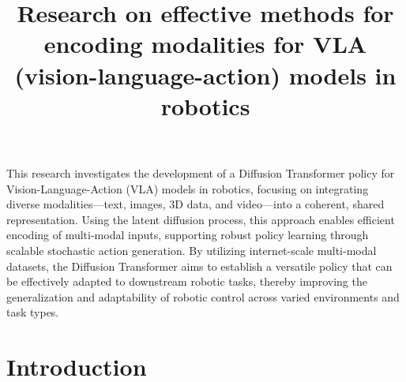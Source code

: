 \documentclass[12pt]{article}
\title{Research on effective methods for encoding modalities for VLA (vision-language-action) models in robotics}
\date{}
\begin{document}
\maketitle
This research investigates the development of a Diffusion Transformer policy for Vision-Language-Action (VLA) models in robotics, focusing on integrating diverse modalities—text, images, 3D data, and video—into a coherent, shared representation. Using the latent diffusion process, this approach enables efficient encoding of multi-modal inputs, supporting robust policy learning through scalable stochastic action generation. By utilizing internet-scale multi-modal datasets, the Diffusion Transformer aims to establish a versatile policy that can be effectively adapted to downstream robotic tasks, thereby improving the generalization and adaptability of robotic control across varied environments and task types. 

\section{Introduction}
\end{document}
